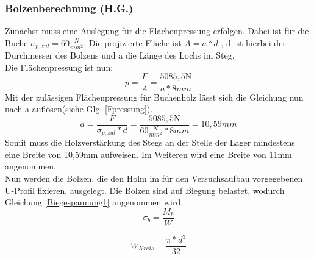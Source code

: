 

\subsubsection{Bolzenberechnung (H.G.)}
Zunächst muss eine Auslegung für die Flächenpressung erfolgen. Dabei ist für die Buche $\sigma_{p,zul}=60\frac{N}{mm^2}$.
Die projizierte Fläche ist $A=a*d$ , d ist hierbei der Durchmesser des Bolzens und a die Länge des Lochs im Steg.\\
\noindent
Die Flächenpressung ist nun: 
\begin{equation}
	p=\frac{F}{A}=\frac{5085,5\mathrm{N}}{a*8mm}
\end{equation}
Mit der zulässigen Flächenpressung für Buchenholz lässt sich die Gleichung nun nach a auflösen(siehe Glg. \ref{Fpressung}).
\begin{equation}
\label{Fpressung}
	a=\frac{F}{\sigma_{p,zul}*d}=\frac{5085,5\mathrm{N}}{60\frac{N}{mm^{2}}*8mm}=10,59mm
\end{equation}
Somit muss die Holzverstärkung des Stegs an der Stelle der Lager mindestens eine Breite von 10,59$\mathrm{mm}$ aufweisen. Im Weiteren wird eine Breite von 11$\mathrm{mm}$ angenommen.\\
\noindent
Nun werden die Bolzen, die den Holm im für den Versuchsaufbau vorgegebenen U-Profil fixieren, ausgelegt. Die Bolzen sind auf Biegung belastet, wodurch Gleichung \ref{Biegespannung1} angenommen wird.
\begin{equation}
\label{Biegespannung1}
	\sigma_{b}=\frac{M_{b}}{W} 
\end{equation}
 
 \begin{equation}
 \label{WKreis}
 	W_{Kreis}=\frac{\pi*d^{3}}{32}
 \end{equation}
  
